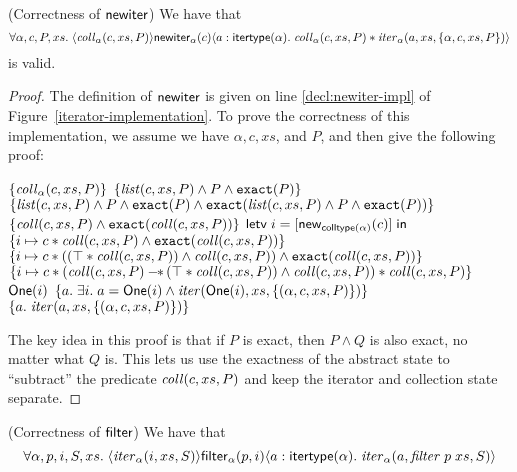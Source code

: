 \begin{lemma}{(Correctness of $\mathsf{newiter}$)}
We have that
\begin{displaymath}
\forall \alpha, c, P, xs.\; \langle{\mathit{coll}_\alpha(c, xs, P)}\rangle{\mathsf{newiter}_\alpha(c)}\langle{a:\mathsf{itertype}(\alpha)}.\;{\mathit{coll}_\alpha(c, xs, P) * 
                                  \mathit{iter}_\alpha(a, xs, \{{\alpha, c, xs, P}\})}\rangle
\end{displaymath}
is valid.
\end{lemma}

\begin{proof}
The definition of $\mathsf{newiter}$ is given on line \ref{decl:newiter-impl} of
Figure~\ref{iterator-implementation}. To prove the correctness of this
implementation, we assume we have $\alpha, c, xs$, and $P$, and then
give the following proof: 

\begin{specification}
\nextline $\{{\mathit{coll}_\alpha(c, xs, P)}\}$ 
\nextline $\{{\mathit{list}(c, xs, P) \land P \land \mathtt{exact}({P})}\}$ 
\nextline $\{{\mathit{list}(c, xs, P) \land P \land \mathtt{exact}({P})  \land \mathtt{exact}({\mathit{list}(c, xs, P) \land P \land \mathtt{exact}({P})})}\}$ 
\nextline $\{{\mathit{coll}(c, xs, P) \land \mathtt{exact}({\mathit{coll}(c, xs, P)})}\}$ 
\nextline $\mathsf{letv}\;i = [\mathsf{new}_{\mathsf{colltype}(\alpha)}(c)]\;\mathsf{in}\;$ 
\nextline $\{{i \mapsto c * \mathit{coll}(c, xs, P) \land \mathtt{exact}({\mathit{coll}(c, xs, P)})}\}$ 
\nextline $\{{i \mapsto c * ((\top * \mathit{coll}(c, xs, P)) \land \mathit{coll}(c, xs, P)) \land \mathtt{exact}({\mathit{coll}(c, xs, P)})}\}$ 
\nextline $\{{i \mapsto c * (\mathit{coll}(c, xs, P) -\!\!*\, (\top * \mathit{coll}(c, xs, P)) \land \mathit{coll}(c, xs, P)) * \mathit{coll}(c, xs, P)}\}$ 
\nextline $\mathsf{One}(i)$ 
\nextline $\{{a.\; \exists i.\; a = \mathsf{One}(i) \land \mathit{iter}(\mathsf{One}(i), xs, \{{(\alpha, c, xs, P)}\})}\}$ 
\nextline $\{{a.\; \mathit{iter}(a, xs, \{{(\alpha, c, xs, P)}\})}\}$ 

\end{specification}

The key idea in this proof is that if $P$ is exact, then $P \land Q$
is also exact, no matter what $Q$ is.  This lets us use the exactness
of the abstract state to ``subtract'' the predicate $\mathit{coll}(c, xs, P)$
and keep the iterator and collection state separate. 

\end{proof}

\begin{lemma}{(Correctness of $\mathsf{filter}$)}
We have that
\begin{displaymath}
  \forall \alpha, p, i, S, xs.\; \langle{\mathit{iter}_\alpha(i, xs, S)}\rangle{\mathsf{filter}_\alpha(p, i)}\langle{a:\mathsf{itertype}(\alpha)}.\;{\mathit{iter}_\alpha(a, \mathit{filter}\;p\;xs, S)}\rangle
\end{displaymath}
\end{lemma}


